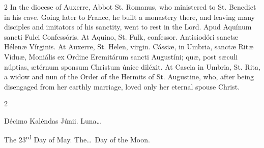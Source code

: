 \begin{paracol}{2}
\switchcolumn
{}
In the diocese of Auxerre, Abbot 
 St. Romanus, who ministered to St. Benedict in his cave. Going later 
 to France, he built a monastery there, and leaving many disciples and 
 imitators of his sanctity, went to rest in the Lord.
\switchcolumn*
{}
Apud Aquínum sancti 
 Fulci Confessóris.
\switchcolumn
{}
At Aquino, St. Fulk, confessor.
\switchcolumn*
{}
Antisiodóri sanctæ 
 Hélenæ Vírginis.
\switchcolumn
{}
At Auxerre, St. Helen, virgin.
\switchcolumn*
{}
Cássiæ, in Umbria, 
 sanctæ Ritæ Víduæ, Moniális ex Ordine Eremitárum sancti Augustíni; quæ, post 
 sæculi núptias, ætérnum sponsum Christum únice diléxit.
\switchcolumn
{}
At Cascia in Umbria, St. Rita, a 
 widow and nun of the Order of the Hermits of St. Augustine, who, after being 
 disengaged from her earthly marriage, loved only her eternal spouse Christ.
\switchcolumn*
{}
\end{paracol}


\begin{paracol}{2}
\begin{center}{\color{gregoriocolor} Décimo Kaléndas Júnii. 
 Luna\dots\ }\end{center}
\switchcolumn
{}
\begin{center}{\color{gregoriocolor} The 
 23\textsuperscript{rd} Day of May. The\dots\ Day of the Moon.}\end{center}
\end{paracol}

